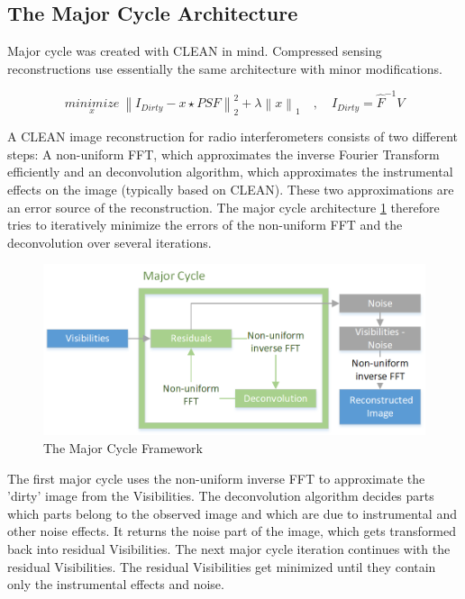 \subsection{The Major Cycle Architecture}
Major cycle was created with CLEAN in mind. Compressed sensing reconstructions use essentially the same architecture with minor modifications. 

\begin{equation}\label{intro:clean}
\underset{x}{minimize} \: \left \|  I_{Dirty} - x \star PSF \right \|_2^2 + \lambda \left \| x \right \|_1 \quad, \quad I_{Dirty} = \hat{F}^{-1} V
\end{equation}



A CLEAN image reconstruction for radio interferometers consists of two different steps: A non-uniform FFT, which approximates the inverse Fourier Transform efficiently and an deconvolution algorithm, which approximates the instrumental effects on the image (typically based on CLEAN). These two approximations are an error source of the reconstruction. The major cycle architecture \ref{intro:major} therefore tries to iteratively minimize the errors of the non-uniform FFT and the deconvolution over several iterations.

\begin{figure}
	\centering
	\vspace{-10pt}
	\includegraphics[width=1.0\linewidth]{./chapters/01.intro/Major-Minor.png}
	\caption{The Major Cycle Framework}
	\label{intro:major}
	\vspace{-10pt}
\end{figure}

The first major cycle uses the non-uniform inverse FFT to approximate the 'dirty' image from the Visibilities. The deconvolution algorithm decides parts which parts belong to the observed image and which are due to instrumental and other noise effects. It returns the noise part of the image, which gets transformed back into residual Visibilities. The next major cycle iteration continues with the residual Visibilities. The residual Visibilities get minimized until they contain only the instrumental effects and noise.


